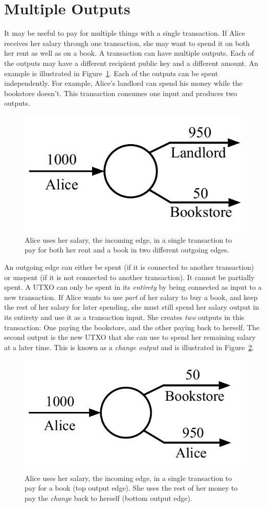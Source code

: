 \section{Multiple Outputs}

It may be useful to pay for multiple things with a single transaction. If Alice receives
her salary through one transaction, she may want to spend it on both her rent as well
as on a book. A transaction can have multiple outputs. Each of the outputs may have a
different recipient public key and a different amount. An example is illustrated in
Figure~\ref{fig.utxo-multiple-outputs}. Each of the outputs can be spent independently.
For example, Alice's landlord can spend his money while the bookstore doesn't. This
transaction consumes one input and produces two outputs.

\begin{figure}[h]
    \centering
    \includegraphics[width=0.35 \columnwidth,keepaspectratio]{figures/utxo-multiple-outputs.pdf}
    \caption{Alice uses her salary, the incoming edge, in a single transaction to pay for
             both her rent and a book in two different outgoing edges.}
    \label{fig.utxo-multiple-outputs}
\end{figure}

An outgoing edge can either be spent (if it is connected to another transaction) or
unspent (if it is not connected to another transaction). It cannot be partially spent.
A UTXO can only be spent in its \emph{entirety} by being connected as input to a new
transaction. If Alice wants to use \emph{part} of her salary to buy a book, and keep
the rest of her salary for later spending, she must still spend her salary output
in its entirety and use it as a transaction input. She creates \emph{two} outputs
in this transaction: One paying the bookstore, and the other paying back to herself.
The second output is the new UTXO that she can use to spend her remaining salary
at a later time. This is known as a \emph{change output} and is
illustrated in Figure~\ref{fig.utxo-change}.

\begin{figure}[h]
    \centering
    \includegraphics[width=0.35 \columnwidth,keepaspectratio]{figures/utxo-change.pdf}
    \caption{Alice uses her salary, the incoming edge, in a single transaction to pay for
             a book (top output edge). She uses the rest of her money to pay the
             \emph{change} back to herself (bottom output edge).}
    \label{fig.utxo-change}
\end{figure}


